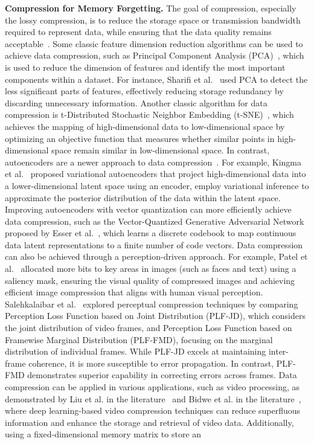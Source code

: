 \documentclass[journal,hideappendix]{vgtc}
\newenvironment{j_itemize}{
\begin{itemize}[]
  \setlength{\itemsep}{3pt}
  \setlength{\parskip}{0pt}
  \setlength{\parsep}{0pt}
}{\end{itemize}}
\begin{document}
\begin{j_itemize}

    \item[$\bullet$] \textbf{Compression for Memory Forgetting.} The goal of compression, especially the lossy compression, is to reduce the storage space or transmission bandwidth required to represent data, while ensuring that the data quality remains acceptable~\cite{lelewer1987data,salomon2002data,goyal2008compressive}. 
    Some classic feature dimension reduction algorithms can be used to achieve data compression, such as Principal Component Analysis (PCA)~\cite{wold1987principal}, which is used to reduce the dimension of features and identify the most important components within a dataset. For instance, Sharifi et al.~\cite{sharifi2019removing} used PCA to detect the less significant parts of features, effectively reducing storage redundancy by discarding unnecessary information. Another classic algorithm for data compression is t-Distributed Stochastic Neighbor Embedding (t-SNE)~\cite{van2008visualizing}, which achieves the mapping of high-dimensional data to low-dimensional space by optimizing an objective function that measures whether similar points in high-dimensional space remain similar in low-dimensional space. In contrast, autoencoders are a newer approach to data compression~\cite{kingma2013auto,feng2024memristor}. For example, Kingma et al.~\cite{kingma2013auto} proposed variational autoencoders that project high-dimensional data into a lower-dimensional latent space using an encoder, employ variational inference to approximate the posterior distribution of the data within the latent space. Improving autoencoders with vector quantization can more efficiently achieve data compression, such as the Vector-Quantized Generative Adversarial Network proposed by Esser et al.~\cite{esser2021taming}, which learns a discrete codebook to map continuous data latent representations to a finite number of code vectors. Data compression can also be achieved through a perception-driven approach. For example, Patel et al.~\cite{patel2021saliency} allocated more bits to key areas in images (such as faces and text) using a saliency mask, ensuring the visual quality of compressed images and achieving efficient image compression that aligns with human visual perception. Salehkalaibar et al.~\cite{salehkalaibar2024choice} explored perceptual compression techniques by comparing Perception Loss Function based on Joint Distribution (PLF-JD), which considers the joint distribution of video frames, and Perception Loss Function based on Framewise Marginal Distribution (PLF-FMD), focusing on the marginal distribution of individual frames. While PLF-JD excels at maintaining inter-frame coherence, it is more susceptible to error propagation. In contrast, PLF-FMD demonstrates superior capability in correcting errors across frames. Data compression can be applied in various applications, such as video processing, as demonstrated by Liu et al. in the literature~\cite{liu2020deep} and Bidwe et al. in the literature~\cite{bidwe2022deep}, where deep learning-based video compression techniques can reduce superfluous information and enhance the storage and retrieval of video data. Additionally, using a fixed-dimensional memory matrix to store an 
\end{j_itemize}
\end{document}
